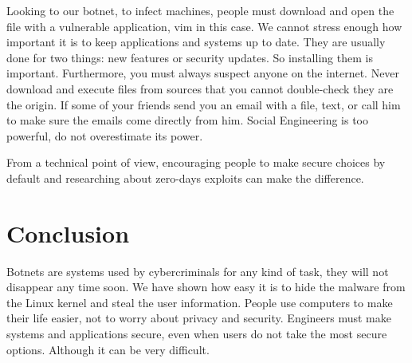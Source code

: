 \documentclass[11pt, a4paper,twoside]{tesi_upf}
\begin{document}
Looking to our botnet, to infect machines, people must download and open the file with a vulnerable application, vim in this case. We cannot stress enough how important it is to keep applications and systems up to date. They are usually done for two things: new features or security updates. So installing them is important. Furthermore, you must always suspect anyone on the internet. Never download and execute files from sources that you cannot double-check they are the origin. If some of your friends send you an email with a file, text, or call him to make sure the emails come directly from him. Social Engineering is too powerful, do not overestimate its power.

From a technical point of view, encouraging people to make secure choices by default and researching about zero-days exploits can make the difference.

\clearpage
\chapter{Conclusion}

Botnets are systems used by cybercriminals for any kind of task, they will not disappear any time soon. We have shown how easy it is to hide the malware from the Linux kernel and steal the user information. People use computers to make their life easier, not to worry about privacy and security. Engineers must make systems and applications secure, even when users do not take the most secure options. Although it can be very difficult.






\backmatter
\printindex
\end{document}
